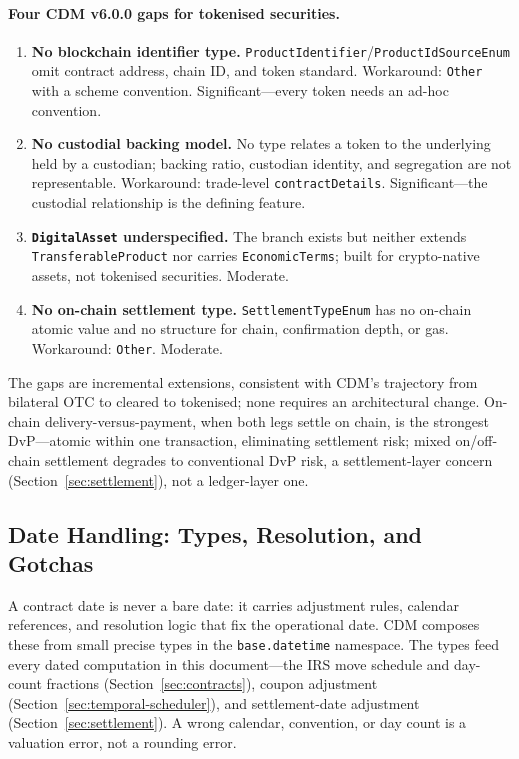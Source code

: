 \documentclass[11pt,a4paper]{article}
\begin{document}
\paragraph{Four CDM v6.0.0 gaps for tokenised securities.}
\begin{enumerate}[nosep]
\item \textbf{No blockchain identifier type.} \texttt{ProductIdentifier}/\texttt{ProductIdSourceEnum} omit contract address, chain ID, and token standard. Workaround: \texttt{Other} with a scheme convention. Significant---every token needs an ad-hoc convention.
\item \textbf{No custodial backing model.} No type relates a token to the underlying held by a custodian; backing ratio, custodian identity, and segregation are not representable. Workaround: trade-level \texttt{contractDetails}. Significant---the custodial relationship is the defining feature.
\item \textbf{\texttt{DigitalAsset} underspecified.} The branch exists but neither extends \texttt{Transferable\allowbreak Product} nor carries \texttt{EconomicTerms}; built for crypto-native assets, not tokenised securities. Moderate.
\item \textbf{No on-chain settlement type.} \texttt{SettlementTypeEnum} has no on-chain atomic value and no structure for chain, confirmation depth, or gas. Workaround: \texttt{Other}. Moderate.
\end{enumerate}
The gaps are incremental extensions, consistent with CDM's trajectory from bilateral OTC to cleared to tokenised; none requires an architectural change. On-chain delivery-versus-payment, when both legs settle on chain, is the strongest DvP---atomic within one transaction, eliminating settlement risk; mixed on/off-chain settlement degrades to conventional DvP risk, a settlement-layer concern (Section~\ref{sec:settlement}), not a ledger-layer one.

\subsection{Date Handling: Types, Resolution, and Gotchas}
\label{sec:cdm-dates}

A contract date is never a bare date: it carries adjustment rules, calendar references, and resolution logic that fix the operational date. CDM composes these from small precise types in the \texttt{base.datetime} namespace. The types feed every dated computation in this document---the IRS move schedule and day-count fractions (Section~\ref{sec:contracts}), coupon adjustment (Section~\ref{sec:temporal-scheduler}), and settlement-date adjustment (Section~\ref{sec:settlement}). A wrong calendar, convention, or day count is a valuation error, not a rounding error.
\end{document}
